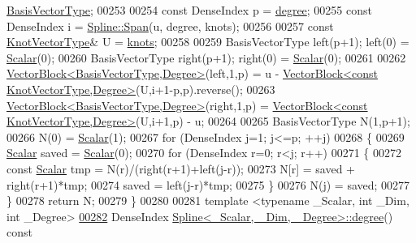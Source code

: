 \begin{DoxyCode}
       \hyperlink{group___splines___module_a1d49cef942ea59d85d1711ee32354e6b}{BasisVectorType};
00253 
00254     \textcolor{keyword}{const} DenseIndex p = \hyperlink{group___splines___module_a0df23e941ac0f31dcd095a4dd4f4a7ec}{degree};
00255     \textcolor{keyword}{const} DenseIndex i = \hyperlink{group___splines___module_aaba7632c61b84194e890696c2b57be1b}{Spline::Span}(u, degree, knots);
00256 
00257     \textcolor{keyword}{const} \hyperlink{group___splines___module_a066f7a8b120316c9068b559f0790e9ec}{KnotVectorType}& U = \hyperlink{group___splines___module_ae3eac8af580ad880d8ad3a259d453aa1}{knots};
00258 
00259     BasisVectorType left(p+1); left(0) = \hyperlink{group___splines___module_a8cafd78b564825c76fbb3419653d9742}{Scalar}(0);
00260     BasisVectorType right(p+1); right(0) = \hyperlink{group___splines___module_a8cafd78b564825c76fbb3419653d9742}{Scalar}(0);        
00261 
00262     \hyperlink{group___core___module_class_eigen_1_1_vector_block}{VectorBlock<BasisVectorType,Degree>}(left,1,p) = u - 
      \hyperlink{group___core___module_class_eigen_1_1_vector_block}{VectorBlock<const KnotVectorType,Degree>}(U,i+1-p,p).reverse();
00263     \hyperlink{group___core___module_class_eigen_1_1_vector_block}{VectorBlock<BasisVectorType,Degree>}(right,1,p) = 
      \hyperlink{group___core___module_class_eigen_1_1_vector_block}{VectorBlock<const KnotVectorType,Degree>}(U,i+1,p) - u;
00264 
00265     BasisVectorType N(1,p+1);
00266     N(0) = \hyperlink{group___splines___module_a8cafd78b564825c76fbb3419653d9742}{Scalar}(1);
00267     \textcolor{keywordflow}{for} (DenseIndex j=1; j<=p; ++j)
00268     \{
00269       \hyperlink{group___splines___module_a8cafd78b564825c76fbb3419653d9742}{Scalar} saved = \hyperlink{group___splines___module_a8cafd78b564825c76fbb3419653d9742}{Scalar}(0);
00270       \textcolor{keywordflow}{for} (DenseIndex r=0; r<j; r++)
00271       \{
00272         \textcolor{keyword}{const} \hyperlink{group___splines___module_a8cafd78b564825c76fbb3419653d9742}{Scalar} tmp = N(r)/(right(r+1)+left(j-r));
00273         N[r] = saved + right(r+1)*tmp;
00274         saved = left(j-r)*tmp;
00275       \}
00276       N(j) = saved;
00277     \}
00278     \textcolor{keywordflow}{return} N;
00279   \}
00280 
00281   \textcolor{keyword}{template} <\textcolor{keyword}{typename} \_Scalar, \textcolor{keywordtype}{int} \_Dim, \textcolor{keywordtype}{int} \_Degree>
\hyperlink{group___splines___module_a0df23e941ac0f31dcd095a4dd4f4a7ec}{00282}   DenseIndex \hyperlink{group___splines___module_a0df23e941ac0f31dcd095a4dd4f4a7ec}{Spline<\_Scalar, \_Dim, \_Degree>::degree}()\textcolor{keyword}{ const}

\end{DoxyCode}

